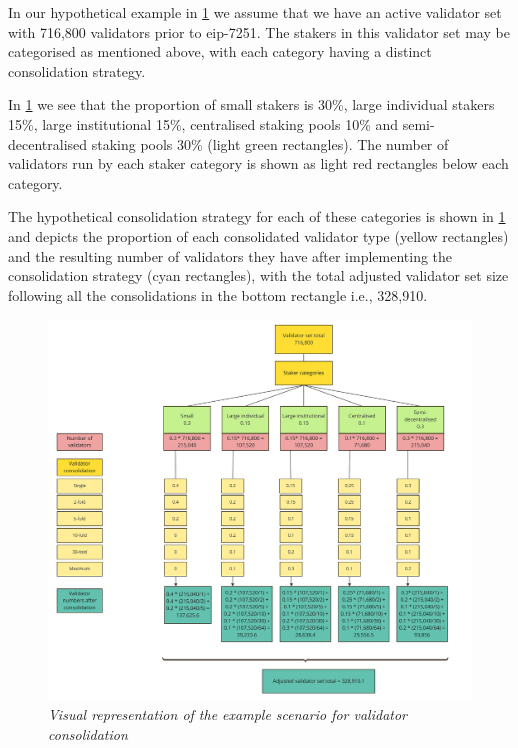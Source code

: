 \documentclass[submission,copyright,creativecommons]{eptcs}
\begin{document}
In our hypothetical example in \cref{fig:consolidation} we assume that we have an active validator set with 716,800
validators prior to \gls{eip}-7251. The stakers in this validator set may be categorised as mentioned above, with each category having a distinct consolidation strategy. 

In \cref{fig:consolidation}  we see that the proportion of small stakers is 30\%, large individual stakers 15\%, large institutional 15\%, centralised staking pools 10\% and semi-decentralised staking pools 30\% (light green rectangles). The number of validators run by each staker category is shown as light red rectangles below each category.

The hypothetical consolidation strategy for each of these categories is shown in \cref{fig:consolidation} and depicts the proportion of each consolidated validator type (yellow rectangles) and the resulting number of validators they have after implementing the consolidation strategy  (cyan rectangles), with the total adjusted validator set size following all the consolidations in the bottom rectangle i.e., 328,910.

\begin{figure}[htbp]
\begin{center}
\includegraphics[width=0.95\linewidth]{images/proposer-selection-diagram}
\caption\emph{Visual representation of the example scenario for validator
consolidation}
\label{fig:consolidation}
\end{center}
\end{figure}
\end{document}
